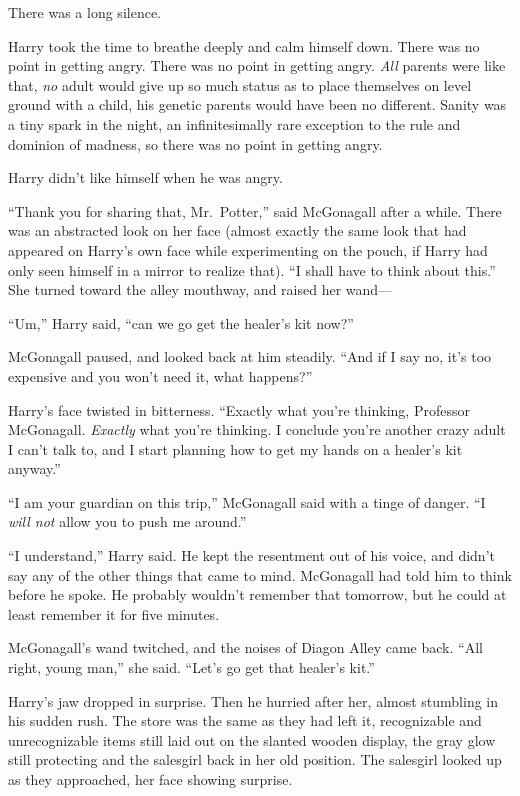 There was a long silence.

Harry took the time to breathe deeply and calm himself down. There was no point in getting angry. There was no point in getting angry. \emph{All} parents were like that, \emph{no} adult would give up so much status as to place themselves on level ground with a child, his genetic parents would have been no different. Sanity was a tiny spark in the night, an infinitesimally rare exception to the rule and dominion of madness, so there was no point in getting angry.

Harry didn’t like himself when he was angry.

“Thank you for sharing that, Mr.~Potter,” said McGonagall after a while. There was an abstracted look on her face (almost exactly the same look that had appeared on Harry’s own face while experimenting on the pouch, if Harry had only seen himself in a mirror to realize that). “I shall have to think about this.” She turned toward the alley mouthway, and raised her wand—

“Um,” Harry said, “can we go get the healer’s kit now?”

McGonagall paused, and looked back at him steadily. “And if I say no, it’s too expensive and you won’t need it, what happens?”

Harry’s face twisted in bitterness. “Exactly what you’re thinking, Professor McGonagall. \emph{Exactly} what you’re thinking. I conclude you’re another crazy adult I can’t talk to, and I start planning how to get my hands on a healer’s kit anyway.”

“I am your guardian on this trip,” McGonagall said with a tinge of danger. “I \emph{will not} allow you to push me around.”

“I understand,” Harry said. He kept the resentment out of his voice, and didn’t say any of the other things that came to mind. McGonagall had told him to think before he spoke. He probably wouldn’t remember that tomorrow, but he could at least remember it for five minutes.

McGonagall’s wand twitched, and the noises of Diagon Alley came back. “All right, young man,” she said. “Let’s go get that healer’s kit.”

Harry’s jaw dropped in surprise. Then he hurried after her, almost stumbling in his sudden rush.
\sbreak
The store was the same as they had left it, recognizable and unrecognizable items still laid out on the slanted wooden display, the gray glow still protecting and the salesgirl back in her old position. The salesgirl looked up as they approached, her face showing surprise.

